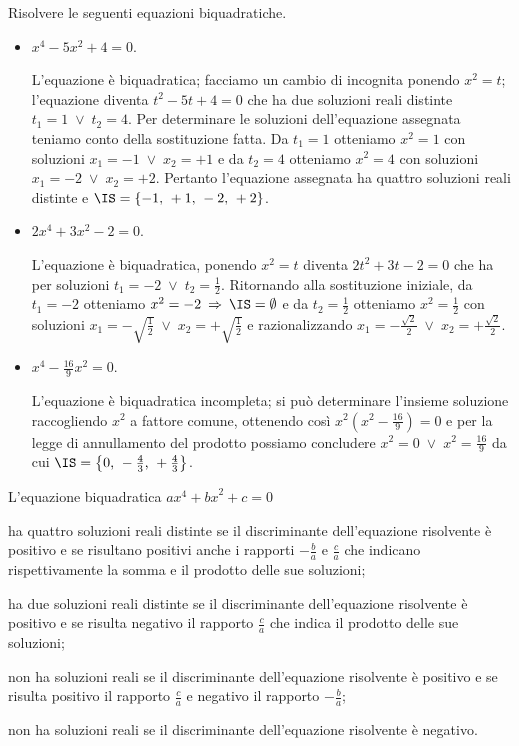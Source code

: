 \begin{exrig}
\begin{esempio}
Risolvere le seguenti equazioni biquadratiche.
\begin{itemize}
\item $ x^4-5x^2+4=0 $.

L'equazione è biquadratica; facciamo un cambio di incognita ponendo $x^2=t$; l'equazione diventa $t^2-5t+4=0$ che ha due soluzioni reali distinte $t_1=1\;\vee \;t_2=4$. Per determinare le soluzioni dell'equazione assegnata teniamo conto della sostituzione fatta. Da $t_1=1$ otteniamo $x^2=1$ con soluzioni $x_1=-1\;\vee\; x_2=+1$ e da $t_2=4$ otteniamo $x^2=4$ con soluzioni $x_1=-2\;\vee\; x_2=+2$. Pertanto l'equazione assegnata ha quattro soluzioni reali distinte e $\IS=\{-1\text{, }+1\text{, }-2\text{, }+2\}$.

\item $ 2x^4+3x^2-2=0 $.

L'equazione è biquadratica, ponendo $x^2=t$ diventa $2t^2+3t-2=0$ che ha per soluzioni $t_1=-2\;\vee\; t_2=\frac 1 2$. Ritornando alla sostituzione iniziale, da $t_1=-2$ otteniamo $x^2=-2\:\Rightarrow\: \IS=\emptyset $ e da $t_2=\frac 1 2$ otteniamo $x^2=\frac 1 2$ con soluzioni $x_1=-\sqrt{\frac 1 2}\;\vee\; x_2=+\sqrt{\frac 1 2}$ e razionalizzando $x_1=-\frac{\sqrt 2} 2\;\vee\; x_2=+\frac{\sqrt 2} 2$.

\item $ x^4-\frac{16} 9x^2=0 $.

L'equazione è biquadratica incompleta; si può determinare l'insieme soluzione raccogliendo $x^2$ a fattore comune, ottenendo così $x^2\left(x^2-\frac{16} 9\right)=0$ e per la legge di annullamento del prodotto possiamo concludere $x^2=0\;\vee\; x^2=\frac{16} 9$ da cui $\IS=\left\{0\text{, }-\frac 4 3\text{, }+\frac 4 3\right\}$.
 \end{itemize}

\end{esempio}
\end{exrig}
\conclusione
L'equazione biquadratica ${ax}^4+{bx}^2+c=0$
\begin{itemize*}
\item ha quattro soluzioni reali distinte se il discriminante dell'equazione risolvente è positivo e se risultano positivi anche i rapporti $-\frac b a$ e $\frac c a$ che indicano rispettivamente la somma e il prodotto delle sue soluzioni;
\item ha due soluzioni reali distinte se il discriminante dell'equazione risolvente è positivo e se risulta negativo il rapporto $\frac c a$ che indica il prodotto delle sue soluzioni;
\item non ha soluzioni reali se il discriminante dell'equazione risolvente è positivo e se risulta positivo il rapporto $\frac c a$ e negativo il rapporto $-\frac b a$;
\item non ha soluzioni reali se il discriminante dell'equazione risolvente è negativo.
\end{itemize*}
